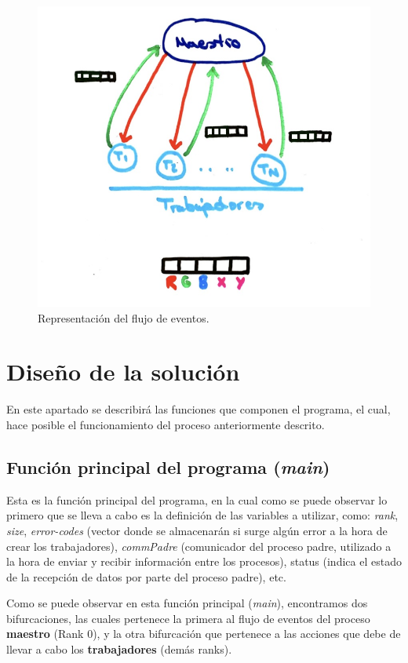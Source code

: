 \documentclass[11pt]{article}
\begin{document}
\begin{figure}[H]
\centering
\includegraphics[width=120mm]{flujo.PNG}
\caption{Representación del flujo de eventos.}
\label{fig:flujo}
\end{figure}




\newpage
\section{Diseño de la solución}
En este apartado se describirá las funciones que componen el programa, el cual, hace posible el funcionamiento del proceso anteriormente descrito.

\subsection{Función principal del programa (\textit{main})}
Esta es la función principal del programa, en la cual como se puede observar lo primero que se lleva a cabo es la definición de las variables a utilizar, como: \textit{rank}, \textit{size}, \textit{error-codes} (vector donde se almacenarán si surge algún error a la hora de crear los trabajadores), \textit{commPadre} (comunicador del proceso padre, utilizado a la hora de enviar y recibir información entre los procesos), status (indica el estado de la recepción de datos por parte del proceso padre), etc.

Como se puede observar en esta función principal (\textit{main}), encontramos dos bifurcaciones, las cuales pertenece la primera al flujo de eventos del proceso \textbf{maestro} (Rank 0), y la otra bifurcación que pertenece a las acciones que debe de llevar a cabo los \textbf{trabajadores} (demás ranks).
\end{document}
